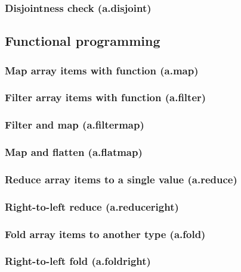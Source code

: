 \documentclass{article}
\theoremstyle{definition}
\begin{document}
\subsubsection{Disjointness check (a.disjoint)}

\subsection{Functional programming}

\subsubsection{Map array items with function (a.map)}

\subsubsection{Filter array items with function (a.filter)}

\subsubsection{Filter and map (a.filtermap)}

\subsubsection{Map and flatten (a.flatmap)}

\subsubsection{Reduce array items to a single value (a.reduce)}

\subsubsection{Right-to-left reduce (a.reduceright)}

\subsubsection{Fold array items to another type (a.fold)}

\subsubsection{Right-to-left fold (a.foldright)}
\end{document}
